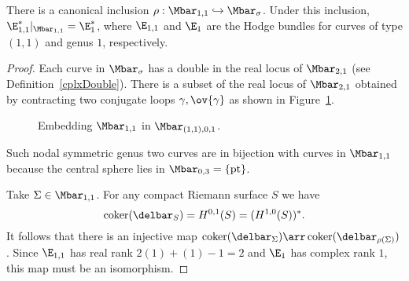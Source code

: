 \begin{lemma} \label{11sigma}
There is a canonical inclusion $\rho:\Mbar_{1,1} \hookrightarrow \Mbar_\sigma$. Under this inclusion, $\E_{1,1}^*|_{\Mbar_{1,1}} = \E_1^*$, where $\E_{1,1}$ and $\E_1$ are the Hodge bundles for curves of type $(1,1)$ and genus $1$, respectively.
\begin{proof}
Each curve in $\Mbar_\sigma$ has a double in the real locus of $\Mbar_{2,1}$ (see Definition~\ref{cplxDouble}). There is a subset of the real locus of $\Mbar_{2,1}$ obtained by contracting two conjugate loops $\gamma,\ov{\gamma}$ as shown in Figure~\ref{m21}.
\begin{figure}[ht]
\centering
{}
\caption{Embedding $\Mbar_{1,1}$ in $\Mbar_{(1,1),0,1}$.}
\label{m21}
\end{figure}
Such nodal symmetric genus two curves are in bijection with curves in $\Mbar_{1,1}$ because the central sphere lies in $\Mbar_{0,3}=\{\text{pt}\}$.

Take $\Sigma \in \Mbar_{1,1}$. For any compact Riemann surface $S$ we have
\[
\coker(\delbar_S)=H^{0,1}(S)=(H^{1,0}(S))^*.
\]
It follows that there is an injective map $\coker(\delbar_{\Sigma}) \arr \coker(\delbar_{\rho(\Sigma)})$. Since $\E_{1,1}$ has real rank $2(1)+(1)-1=2$ and $\E_1$ has complex rank $1$, this map must be an isomorphism.
\end{proof}
\end{lemma}

